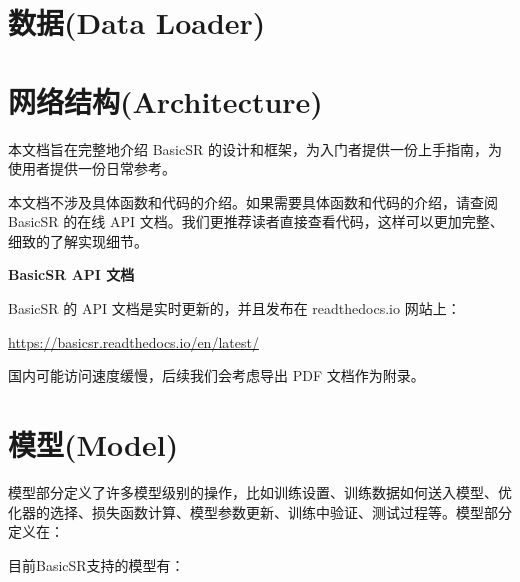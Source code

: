\documentclass[../main.tex]{subfiles}
\begin{document}


\section{数据(Data Loader)}

\section{网络结构(Architecture)}


本文档旨在完整地介绍 BasicSR 的设计和框架，为入门者提供一份上手指南，为使用者提供一份日常参考。

本文档不涉及具体函数和代码的介绍。如果需要具体函数和代码的介绍，请查阅 BasicSR 的在线 API 文档。我们更推荐读者直接查看代码，这样可以更加完整、细致的了解实现细节。

\begin{hl} %
	\textbf{BasicSR API 文档}

	BasicSR 的 API 文档是实时更新的，并且发布在 readthedocs.io 网站上：

	\url{https://basicsr.readthedocs.io/en/latest/}

	国内可能访问速度缓慢，后续我们会考虑导出 PDF 文档作为附录。
\end{hl}

\section{模型(Model)}

模型部分定义了许多模型级别的操作，比如训练设置、训练数据如何送入模型、优化器的选择、损失函数计算、模型参数更新、训练中验证、测试过程等。模型部分定义在：


目前BasicSR支持的模型有：
\end{document}
